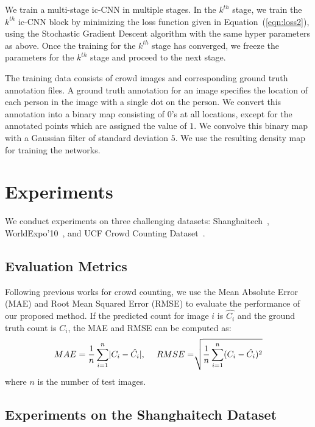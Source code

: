 \documentclass[runningheads]{llncs}
\begin{document}
We train a multi-stage ic-CNN in multiple stages. In the $k^{th}$ stage, we train the $k^{th}$ ic-CNN block by minimizing the loss function given in Equation~(\ref{eqn:loss2}), using the Stochastic Gradient Descent algorithm with the same hyper parameters as above. Once the training for the $k^{th}$ stage has converged, we freeze the parameters for the $k^{th}$ stage and proceed to the next stage. 

The training data consists of crowd images and corresponding ground truth annotation files. A ground truth annotation for an image specifies the location of each person in the image with a single dot on the person.  We convert this annotation into a binary map consisting of $0$'s at all locations, except for the annotated points which are assigned the value  of $1$. We convolve this binary map with a Gaussian filter of standard deviation $5$. We use the resulting density map for training the networks.

\section{Experiments}
We conduct experiments on three challenging datasets: Shanghaitech~\cite{zhang2016single}, WorldExpo'10~\cite{zhang2015cross}, and UCF Crowd Counting Dataset~\cite{idrees2013multi}.

\subsection{Evaluation Metrics}
Following previous works for crowd counting, we use the Mean Absolute Error (MAE) and Root Mean Squared Error (RMSE) to evaluate the performance of our proposed method. If the predicted count for image $i$ is $\hat{C_i}$ and
the ground truth count is $C_i$, the MAE and RMSE can be computed as: 
\begin{align}
MAE = \frac{1}{n}\sum_{i=1}^{n} \lvert C_i - \hat{C_i} \rvert, \hspace{3ex} RMSE = \sqrt[]{\frac{1}{n}\sum_{i=1}^{n} (C_i - \hat{C_i})^2}
\end{align}
where $n$ is the number of test images. 


\subsection{Experiments on the Shanghaitech Dataset}
\end{document}
